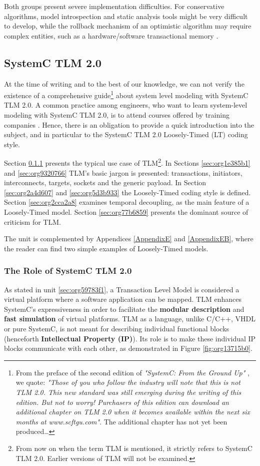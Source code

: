 \documentclass[11pt]{article}
\begin{document}
Both groups present severe implementation difficulties.
For conservative algorithms, model introspection and static analysis tools might be very difficult to develop,
while the rollback mechanism of an optimistic algorithm may require complex entities, such as a hardware/software transactional memory \cite{Anane2015} .

\clearpage

\subsection{SystemC TLM 2.0}
\label{sec:org9a9ea60}
At the time of writing and to the best of our knowledge, we can not verify the existence of a comprehensive guide\footnote{From the preface of the second edition of \textit{"SystemC: From the Ground Up"} \cite{Black2010}, we quote: 
\textit{"Those of you who follow the industry will note that this is not TLM 2.0. This new standard was still emerging during the writing of this edition. But not to worry! Purchasers of this edition can download an additional chapter on TLM 2.0 when it becomes available within the next six months at www.scftgu.com"}.
The additional chapter has not yet been produced\ldots{}} about system level modeling with SystemC TLM 2.0.
A common practice among engineers, who want to learn system-level modeling with SystemC TLM 2.0, is to attend courses offered by training companies \cite{doulos}.
Hence, there is an obligation to provide a quick introduction into the subject, and in particular to the SystemC TLM 2.0 Loosely-Timed (LT) coding style.

Section \ref{sec:orgbc3dfe3} presents the typical use case of TLM\footnote{From now on when the term TLM is mentioned, it strictly refers to SystemC TLM 2.0. 
Earlier versions of TLM will not be examined.}.
In Sections \ref{sec:org1e385b1} and \ref{sec:org9320766} TLM's basic jargon is presented: transactions, initiators, interconnects, targets, sockets and the generic payload.
In Section \ref{sec:org2a4d607} and \ref{sec:org5d3b933} the Loosely-Timed coding style is defined.
Section \ref{sec:org2cca2a8} examines temporal decoupling, as the main feature of a Loosely-Timed model.
Section \ref{sec:org77b6859} presents the dominant source of criticism for TLM.

The unit is complemented by Appendices \ref{AppendixE} and \ref{AppendixEB}, where the reader can find two simple examples of Loosely-Timed models.

\subsubsection{The Role of SystemC TLM 2.0}
\label{sec:orgbc3dfe3}
As stated in unit \ref{sec:org59783f1}, a Transaction Level Model is considered a virtual platform where a software application can be mapped.
TLM enhances SystemC's expressiveness in order to facilitate the \textbf{modular description} and \textbf{fast simulation} of virtual platforms.
TLM as a language, unlike C/C++, VHDL or pure SystemC, is not meant for describing individual functional blocks (henceforth \textbf{Intellectual Property (IP)}).
Its role is to make these individual IP blocks communicate with each other, as demonstrated in Figure \ref{fig:org13715b0}.
\end{document}
